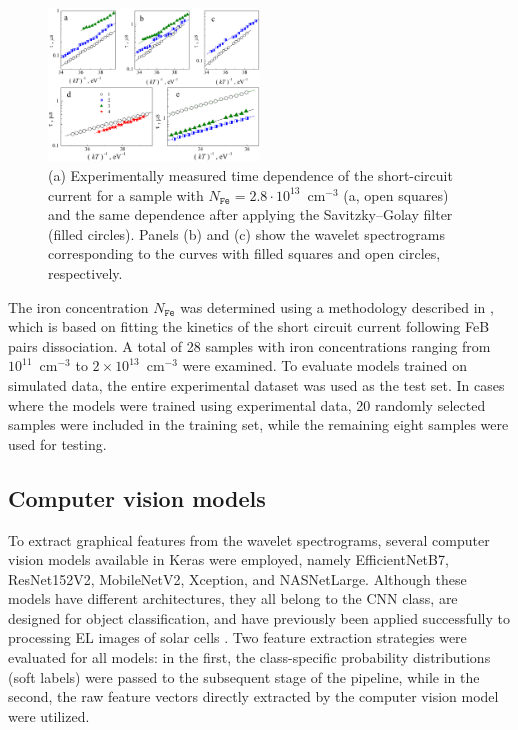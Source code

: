 \documentclass[10pt]{iopart}
\begin{document}
\begin{figure}
\includegraphics[width=0.5\textwidth]{Fig3}
\caption{\label{Fig3}
(a) Experimentally measured time dependence of the short-circuit current for a sample with
$N_\mathtt{Fe}=2.8\cdot10^{13}$~cm$^{-3}$ (a, open  squares) and the same dependence after applying the Savitzky–Golay filter (filled circles).
Panels (b) and (c) show the wavelet spectrograms corresponding to the curves with filled squares and open circles, respectively.
}%
\end{figure}

The iron concentration $N_\mathtt{Fe}$ was determined using a methodology described in \cite{Olikh2022:JMatSci,Olikh2021JAP},
which is based on fitting the kinetics of the short circuit current following FeB pairs dissociation.
A total of 28 samples with iron concentrations ranging from $10^{11}$~cm$^{-3}$ to $2\times10^{13}$~cm$^{-3}$ were examined.
To evaluate models trained on simulated data, the entire experimental dataset was used as the test set.
In cases where the models were trained using experimental data, 20 randomly selected samples were included in the training set,
while the remaining eight samples were used for testing.



\subsection{Computer vision models}\label{subsec:CompVisMod}

To extract graphical features from the wavelet spectrograms, several computer vision models available in Keras were employed,
namely EfficientNetB7, ResNet152V2, MobileNetV2, Xception, and NASNetLarge.
Although these models have different architectures, they all belong to the CNN class, are designed for object classification,
and have previously been applied successfully to processing EL images of solar cells \cite{Jia2024, Otamendi2021, Chen2022, Abdelsattar2025, tella2025}.
Two feature extraction strategies were evaluated for all models:
in the first, the class-specific probability distributions (soft labels) were passed to the subsequent stage of the pipeline,
while in the second, the raw feature vectors directly extracted by the computer vision model were utilized.
\end{document}
